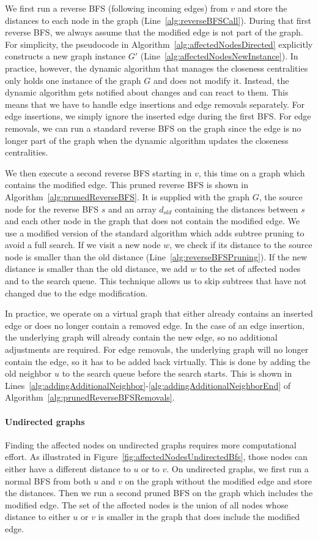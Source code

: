 We first run a reverse BFS (following incoming edges) from $v$ and store the distances to each node in the graph (Line~\ref{alg:reverseBFSCall}). During that first reverse BFS, we always assume that the modified edge is not part of the graph. For simplicity, the pseudocode in Algorithm~\ref{alg:affectedNodesDirected} explicitly constructs a new graph instance $G'$ (Line~\ref{alg:affectedNodesNewInstance}). In practice, however, the dynamic algorithm that manages the closeness centralities only holds one instance of the graph $G$ and does not modify it. Instead, the dynamic algorithm gets notified about changes and can react to them. This means that we have to handle edge insertions and edge removals separately. For edge insertions, we simply ignore the inserted edge during the first BFS. For edge removals, we can run a standard reverse BFS on the graph since the edge is no longer part of the graph when the dynamic algorithm updates the closeness centralities.

We then execute a second reverse BFS starting in $v$, this time on a graph which contains the modified edge. This pruned reverse BFS is shown in Algorithm~\ref{alg:prunedReverseBFS}. It is supplied with the graph $G$, the source node for the reverse BFS $s$ and an array $d_{old}$ containing the distances between $s$ and each other node in the graph that does not contain the modified edge. We use a modified version of the standard algorithm which adds subtree pruning to avoid a full search. If we visit a new node $w$, we check if its distance to the source node is smaller than the old distance (Line~\ref{alg:reverseBFSPruning}). If the new distance is smaller than the old distance, we add $w$ to the set of affected nodes and to the search queue. This technique allows us to skip subtrees that have not changed due to the edge modification.

In practice, we operate on a virtual graph that either already contains an inserted edge or does no longer contain a removed edge. In the case of an edge insertion, the underlying graph will already contain the new edge, so no additional adjustments are required. For edge removals, the underlying graph will no longer contain the edge, so it has to be added back virtually. This is done by adding the old neighbor $u$ to the search queue before the search starts. This is shown in Lines~\ref{alg:addingAdditionalNeighbor}-\ref{alg:addingAdditionalNeighborEnd} of Algorithm~\ref{alg:prunedReverseBFSRemovals}.

\paragraph{Undirected graphs}
Finding the affected nodes on undirected graphs requires more computational effort. As illustrated in Figure~\ref{fig:affectedNodesUndirectedBfs}, those nodes can either have a different distance to $u$ or to $v$. On undirected graphs, we first run a normal BFS from both $u$ and $v$ on the graph without the modified edge and store the distances. Then we run a second pruned BFS on the graph which includes the modified edge. The set of the affected nodes is the union of all nodes whose distance to either $u$ or $v$ is smaller in the graph that does include the modified edge.

